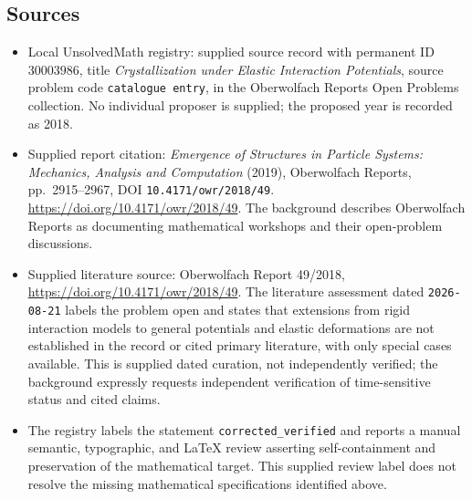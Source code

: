 \documentclass[11pt]{article}
\begin{document}
\subsection{Sources}
\begin{itemize}
\item Local UnsolvedMath registry: supplied source record with permanent ID \(30003986\), title \emph{Crystallization under Elastic Interaction Potentials}, source problem code \texttt{catalogue entry}, in the Oberwolfach Reports Open Problems collection. No individual proposer is supplied; the proposed year is recorded as 2018.
\item Supplied report citation: \emph{Emergence of Structures in Particle Systems: Mechanics, Analysis and Computation} (2019), Oberwolfach Reports, pp.~2915--2967, DOI \texttt{10.4171/owr/2018/49}. \url{https://doi.org/10.4171/owr/2018/49}. The background describes Oberwolfach Reports as documenting mathematical workshops and their open-problem discussions.
\item Supplied literature source: Oberwolfach Report 49/2018, \url{https://doi.org/10.4171/owr/2018/49}. The literature assessment dated \texttt{2026-08-21} labels the problem open and states that extensions from rigid interaction models to general potentials and elastic deformations are not established in the record or cited primary literature, with only special cases available. This is supplied dated curation, not independently verified; the background expressly requests independent verification of time-sensitive status and cited claims.
\item The registry labels the statement \texttt{corrected\_verified} and reports a manual semantic, typographic, and LaTeX review asserting self-containment and preservation of the mathematical target. This supplied review label does not resolve the missing mathematical specifications identified above.
\end{itemize}
\end{document}
